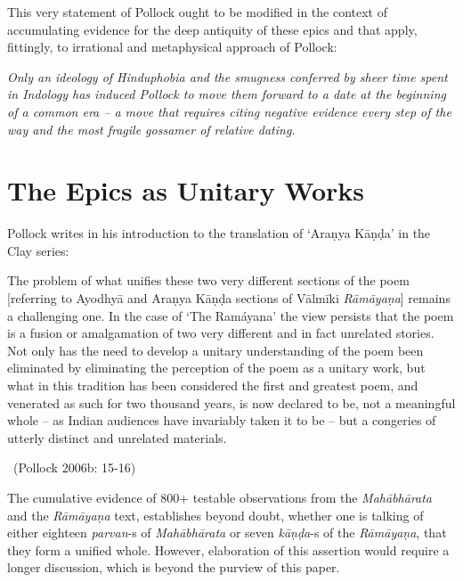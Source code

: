 This very statement of Pollock ought to be modified in the context of accumulating evidence for the deep antiquity of these epics and that apply, fittingly, to irrational and metaphysical approach of Pollock:

\textit{Only an ideology of Hinduphobia and the smugness conferred by sheer time spent in Indology has induced Pollock to move them forward to a date at the beginning of a common era – a move that requires citing negative evidence every step of the way and the most fragile gossamer of relative dating.}


\section*{The Epics as Unitary Works}

Pollock writes in his introduction to the translation of ‘Araṇya Kāṇḍa’ in the Clay series:

\begin{myquote}
The problem of what unifies these two very different sections of the poem [referring to Ayodhyā and Araṇya Kāṇḍa sections of Vālmīki \textit{Rāmāyaṇa}] remains a challenging one. In the case of ‘The Ramáyana’ the view persists that the poem is a fusion or amalgamation of two very different and in fact unrelated stories. Not only has the need to develop a unitary understanding of the poem been eliminated by eliminating the perception of the poem as a unitary work, but what in this tradition has been considered the first and greatest poem, and venerated as such for two thousand years, is now declared to be, not a meaningful whole – as Indian audiences have invariably taken it to be – but a congeries of utterly distinct and unrelated materials. 

~\hfill (Pollock 2006b: 15-16)
\end{myquote}

The cumulative evidence of 800+ testable observations from the \textit{Mahābhārata} and the \textit{Rāmāyaṇa} text, establishes beyond doubt, whether one is talking of either eighteen \textit{parvan}-s of \textit{Mahābhārata} or seven \textit{kāṇḍa}-s of the \textit{Rāmāyaṇa}, that they form a unified whole. However, elaboration of this assertion would require a longer discussion, which is beyond the purview of this paper.


